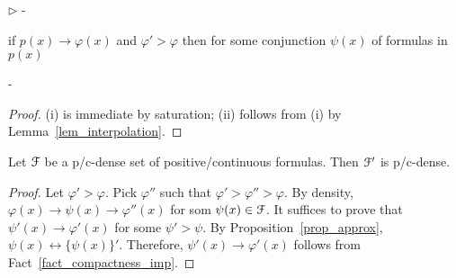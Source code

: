 \documentclass{amsproc}
\newcommand{\mylabel}[1]{{#1}\hfill}
\renewenvironment{itemize}
  {\begin{list}{$\triangleright$}{%
  \setlength{\parskip}{0mm}
  \setlength{\topsep}{.4\baselineskip}
  \setlength{\rightmargin}{0mm}
  \setlength{\listparindent}{0mm}
  \setlength{\itemindent}{0mm}
  \setlength{\labelwidth}{3ex}
  \setlength{\itemsep}{.2\baselineskip}
  \setlength{\parsep}{.2\baselineskip}
  \setlength{\partopsep}{0mm}
  \setlength{\labelsep}{1ex}
  \setlength{\leftmargin}{\labelwidth+\labelsep}
  \let\makelabel\mylabel}}{%
\end{list}}
\begin{document}
{\begin{fact}
\begin{itemize}
    \noindent\kern-\leftmargin

    \item[ii.] if $p(x)\rightarrow\varphi(x)$ and $\varphi'>\varphi$ then for some conjunction $\psi(x)$ of formulas in $p(x)$
    
    \noindent\kern-\leftmargin
  \end{itemize} 
\end{fact}

\begin{proof}
  (i) is immediate by saturation; (ii) follows from (i) by Lemma~\ref{lem_interpolation}.
\end{proof}

\begin{fact}\label{fact_Fdense}
  Let ${\EuScript F}$ be a p/c-dense set of positive/continuous formulas.
  Then ${\EuScript F}'$ is p/c-dense.
\end{fact}

\begin{proof}
  Let $\varphi'>\varphi$.
  Pick $\varphi''$ such that $\varphi'>\varphi''>\varphi$.
  By density, $\varphi(x)\rightarrow\psi(x)\rightarrow\varphi''(x)$ for som $\psi(x)\in{\EuScript F}$.
  It suffices to prove that $\psi'(x)\rightarrow\varphi'(x)$ for some $\psi'>\psi$.
  By Proposition~\ref{prop_approx}, $\psi(x)\leftrightarrow\{\psi(x)\}'$.
  Therefore, $\psi'(x)\rightarrow\varphi'(x)$ follows from Fact~\ref{fact_compactness_imp}.
\end{proof}

  






}
\end{document}
